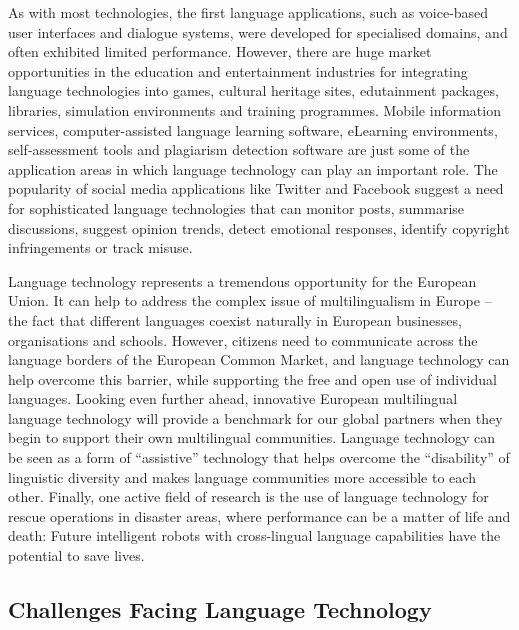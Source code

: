 \begin{multicols}{2}
As with most technologies, the first language applications, such as voice-based user interfaces and dialogue systems, were developed for specialised domains, and often exhibited limited performance. However, there are huge market opportunities in the education and entertainment industries for integrating language technologies into games, cultural heritage sites, edutainment packages, libraries, simulation environments and training programmes. Mobile information services, computer-assisted language learning software, eLearning environments, self-assessment tools and plagiarism detection software are just some of the application areas in which language technology can play an important role. The popularity of social media applications like Twitter and Facebook suggest a need for sophisticated language technologies that can monitor posts, summarise discussions, suggest opinion trends, detect emotional responses, identify copyright infringements or track misuse.


Language technology represents a tremendous opportunity for the European Union. It can help to address the complex issue of multilingualism in Europe -- the fact that different languages coexist naturally in European businesses, organisations and schools. However, citizens need to communicate across the language borders of the European Common Market, and language technology can help overcome this barrier, while supporting the free and open use of individual languages. Looking even further ahead, innovative European multilingual language technology will provide a benchmark for our global partners when they begin to support their own multilingual communities. Language technology can be seen as a form of “assistive” technology that helps overcome the “disability” of linguistic diversity and makes language communities more accessible to each other. Finally, one active field of research is the use of language technology for rescue operations in disaster areas, where performance can be a matter of life and death: Future intelligent robots with cross-lingual language capabilities have the potential to save lives.

\subsection{Challenges Facing Language Technology}


\end{multicols}

